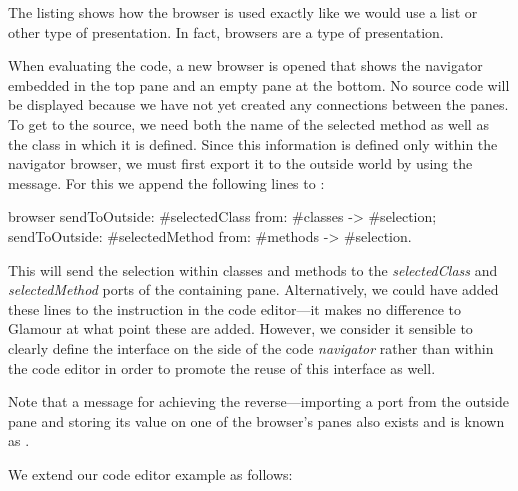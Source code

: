 \documentclass[a4paper,10pt,twoside]{book}
\begin{document}
The listing shows how the browser is used exactly like we would use a
list or other type of presentation. In fact, browsers are a type of
presentation.

When evaluating the code, a new browser is opened that shows the
navigator embedded in the top pane and an empty pane at the bottom. No
source code will be displayed because we have not yet created any
connections between the panes. To get to the source, we need both the
name of the selected method as well as the class in which it is
defined. Since this information is defined only within the navigator
browser, we must first export it to the outside world by using the
 message. For this we append the following
lines to :

\begin{code}{}
browser
	sendToOutside: #selectedClass from: #classes -> #selection;
	sendToOutside: #selectedMethod from: #methods -> #selection.
\end{code}

This will send the selection within classes and methods to the
\emph{selectedClass} and \emph{selectedMethod} ports of the containing
pane. Alternatively, we could have added these lines to the  instruction in the code editor---it makes no
difference to Glamour at what point these are added. However, we
consider it sensible to clearly define the interface on the side of
the code \emph{navigator} rather than within the code editor in order
to promote the reuse of this interface as well.

Note that a message for achieving the reverse---importing a port from
the outside pane and storing its value on one of the browser's panes
also exists and is known as .

We extend our code editor example as follows:

\end{document}

